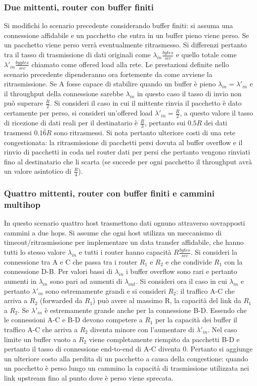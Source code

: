 \subsubsection{Due mittenti, router con buffer finiti}
Si modifichi lo scenario precedente considerando buffer finiti: si assuma una connessione affidabile e un pacchetto che entra in un buffer pieno viene
perso. Se un pacchetto viene perso verr\`a eventualmente ritrasmesso. Si differenzi pertanto tra il tasso di trasmissione di dati originali come $
\lambda_{in}\frac{bytes}{sec}$ e quello totale come $\lambda'_{in}\frac{byytes}{sec}$ chiamato come offered load alla rete. Le prestazioni definite nello 
scenario precedente dipenderanno ora fortemente da come avviene la ritrasmissione. Se A fosse capace di stabilire quando un buffer \`e pieno $
\lambda_{in}=\lambda'_{in}$ e il throughput della connessione sarebbe $\lambda_{in}$ in questo caso il tasso di invio non pu\`o superare $\frac{R}{2}$. Si 
consideri il caso in cui il mittente rinvia il pacchetto \`e dato certamente per perso, si consideri un'offered load $\lambda'_{in}=\frac{R}{2}$, a questo 
valore il tasso di ricezione di dati reali per il destinatario \`e $\frac{R}{3}$, pertanto sui $0.5R$ dei dati trasmessi $0.1\bar{6}R$ sono ritrasmessi. Si 
nota pertanto ulteriore costi di una rete congestionata: la ritrasmissione di pacchetti persi dovuta al buffer overflow e il rinvio di pacchetti in coda nel
router dati per persi che pertanto vengono rinviati fino al destinatario che li scarta (se succede per ogni pacchetto il throughput avr\`a un valore
asintotico di $\frac{R}{4}$).
\subsubsection{Quattro mittenti, router con buffer finiti e cammini multihop}
In questo scenario quattro host trasmettono dati ognuno attraverso sovrapposti cammini a due hops. Si assume che ogni host utilizza un meccanismo di 
timeout/ritrasmissione per implementare un data transfer affidabile, che hanno tutti lo stesso valore $\lambda_{in}$ e tutti i router hanno capacit\`a
$R\frac{bytes}{sec}$. Si consideri la connessione tra A e C che passa tra i router $R_1$ e $R_2$ e che condivide  $R_1$ con la connessione D-B. Per valori
bassi di $\lambda_{in}$ i buffer overflow sono rari e pertanto aumenti in $\lambda_{in}$ sono pari ad aumenti di $\lambda_{out}$. Si consideri ora il caso
in cui $\lambda_{in}$ e pertanto $\lambda'_{in}$ sono estremamente grandi e si consideri $R_2$: il traffico A-C che arriva a $R_2$ (forwarded da $R_1$) 
pu\`o avere al massimo R, la capacit\`a del link da $R_1$ a $R_2$. Se $\lambda'_{in}$ \`e estremamente grande anche per la connessione B-D. Essendo che 
le connessioni A-C e B-D devono competere a $R_1$ per la capacit\`a dei buffer il traffico A-C che arriva a $R_2$ diventa minore con l'aumentare di 
$\lambda'_{in}$. Nel caso limite un buffer vuoto a $R_2$ viene completamente riempito da pacchetti B-D e pertanto il tasso di connessione end-to-end 
di A-C diventa 0. Pertanto si aggiunge un ulteriore costo alla perdita di un pacchetto a causa della congestione: quando un pacchetto \`e perso lungo un 
cammino la capacit\`a di trasmissione utilizzata nei link upstream fino al punto dove \`e perso viene sprecata. 
